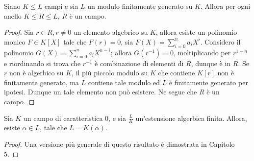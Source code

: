         \begin{esercizio}\label{ex:fields}
            Siano $K \leq L$ campi e sia $L$ un modulo finitamente generato su $K$. Allora per ogni anello $K \leq R \leq L$, $R$ è un campo.
        \end{esercizio}
        \begin{proof}
            Sia $r \in R, r \neq 0$ un elemento algebrico su $K$, allora esiste un polinomio monico $F \in K[X]$ tale che $F(r) = 0$, sia $F(X) = \sum_{i=0}^n a_iX^i$. 
            Considero il polinomio $G(X) = \sum_{i=0}^n a_iX^{n-i}$; allora $G(r^{-1}) = 0$, moltiplicando per $r^{1-n}$ e riordinando si trova che $r^{-1}$ è combinazione 
            di elementi di $R$, dunque è in $R$. Se $r$ non è algerbico su $K$, il più piccolo modulo su $K$ che contiene $K[r]$ non è finitamente generato, ma $L$ contiene 
            tale modulo ed $L$ è finitamente generato per ipotesi. Dunque un tale elemento non può esistere. Ne segue che $R$ è un campo.
        \end{proof}
        \begin{teorema}
            Sia $K$ un campo di caratteristica $0$, e sia $\frac{L}{K}$ un'estensione algerbica finita. Allora, esiste $\alpha \in L$, tale che $L = K(\alpha)$.
        \end{teorema}
        \begin{proof}
            Una versione più generale di questo risultato è dimostrata in \cite{milneFT} Capitolo 5.
        \end{proof}
    
        
    \newpage
